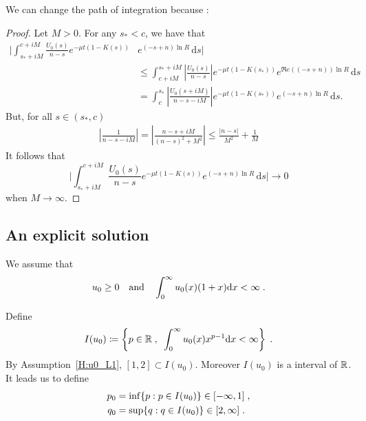 \documentclass[11pt]{amsart}
\renewcommand{\Re}{\mathfrak{R}e}
\newcommand{\diff}{\,\mathrm{d}}
\begin{document}
\begin{remark}
    We can change the path of integration because : 
\end{remark}
\begin{proof}
    Let $M > 0$. For any $s_* < c$, we have that 
    \begin{align*}
        \bigg| \int_{s_*+iM}^{c+iM} \frac{U_0(s)}{n-s} e^{-\mu t(1 - K(s))} &e^{(-s+n)\ln R} \diff s \bigg|
        \\
        &\leq 
     \int_{c+iM}^{s_*+iM} \left|\frac{U_0(s)}{n-s}\right| e^{-\mu t(1 - K(s_*))} e^{\Re((-s+n))\ln R} \diff s \\
     &= 
     \int_{c}^{s_*} \left|\frac{U_0(s+iM)}{n-s-iM}\right| e^{-\mu t(1 - K(s_*))} e^{(-s+n)\ln R} \diff s.
    \end{align*}
But, for all $s \in (s_*, c)$
\begin{align*}
    \left|\frac{1}{n-s-iM}\right| = \left|\frac{n-s + iM}{(n-s)^2+M^2}\right| \leq \frac{|n-s|}{M^2} + \frac1M
\end{align*}
It follows that $$ \bigg| \int_{s_*+iM}^{c+iM} \frac{U_0(s)}{n-s} e^{-\mu t(1 - K(s))} e^{(-s+n)\ln R} \diff s \bigg| \to 0$$ when $M \to \infty$.
\end{proof}

\subsection{An explicit solution}
\label{s:explicit}

We assume that     \begin{equation}
    u_0 \geq 0 \quad \text{and} \quad \int_0^\infty u_0(x) (1+x) \mathrm dx < \infty
    \; .
    \label{H:u0_L1}
\end{equation}

Define 
\begin{equation}
    I(u_0) \coloneqq \left\{ p \in \mathbb{R} \; , \enspace \int_0^\infty u_0(x) x^{p-1} \mathrm dx < \infty \right\}
    \; .
\end{equation}
By Assumption~\eqref{H:u0_L1}, $[1, 2] \subset I(u_0)$. Moreover $I(u_0)$ is a interval of $\mathbb{R}$.\\
It leads us to define
\begin{subequations}
\begin{align*}
    p_0 &= \inf \{p : p \in I(u_0) \} \in [-\infty, 1] \; ,\\
    q_0 &= \sup \{q : q \in I(u_0) \} \in [2, \infty] \; .
\end{align*}    
\end{subequations}
\end{document}
